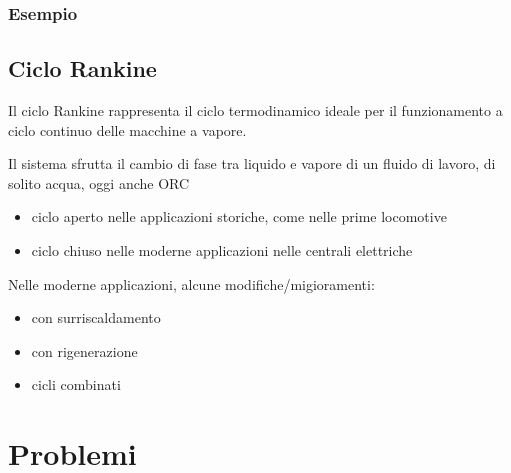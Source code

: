 \documentclass[letterpaper,10pt,italian]{jupyterBook}
\begin{document}
\subsubsection{Esempio}
\label{\detokenize{ch/thermodynamics/heat-engine-joule-brayton:esempio}}
\sphinxAtStartPar
{}

\sphinxstepscope


\subsection{Ciclo Rankine}
\label{\detokenize{ch/thermodynamics/heat-engine-rankine:ciclo-rankine}}\label{\detokenize{ch/thermodynamics/heat-engine-rankine:physics-hs-thermodynamics-heat-engine-rankine}}\label{\detokenize{ch/thermodynamics/heat-engine-rankine::doc}}
\sphinxAtStartPar
Il ciclo Rankine rappresenta il ciclo termodinamico ideale per il funzionamento a ciclo continuo delle macchine a vapore.

\sphinxAtStartPar
Il sistema sfrutta il cambio di fase tra liquido e vapore di un fluido di lavoro, di solito acqua, oggi anche ORC
\begin{itemize}
\item {} 
\sphinxAtStartPar
ciclo aperto nelle applicazioni storiche, come nelle prime locomotive

\item {} 
\sphinxAtStartPar
ciclo chiuso nelle moderne applicazioni nelle centrali elettriche

\end{itemize}

\sphinxAtStartPar
Nelle moderne applicazioni, alcune modifiche/migioramenti:
\begin{itemize}
\item {} 
\sphinxAtStartPar
con surriscaldamento

\item {} 
\sphinxAtStartPar
con rigenerazione

\item {} 
\sphinxAtStartPar
cicli combinati

\end{itemize}

\sphinxstepscope


\section{Problemi}
\label{\detokenize{ch/thermodynamics/heat-engine-problems:problemi}}\label{\detokenize{ch/thermodynamics/heat-engine-problems:physics-hs-thermodynamics-heat-engine-problems}}\label{\detokenize{ch/thermodynamics/heat-engine-problems::doc}}
\end{document}

